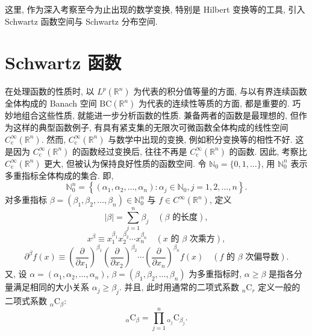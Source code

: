 
这里, 作为深入考察至今为止出现的数学变换, 特别是 Hilbert 变换等的工具, 引入 Schwartz 函数空间与 Schwartz 分布空间.

\section{Schwartz 函数}\label{sec:5.1}










在处理函数的性质时, 以 $L^{p}(\mathbb{R}^{n})$ 为代表的积分值等量的方面, 与以有界连续函数全体构成的 Banach 空间 $\mathrm{BC}(\mathbb{R}^{n})$ 为代表的连续性等质的方面, 都是重要的. 巧妙地组合这些性质, 就能进一步分析函数的性质. 兼备两者的函数是最理想的, 但作为这样的典型函数例子, 有具有紧支集的无限次可微函数全体构成的线性空间 $C_{\mathrm{c}}^{\infty}(\mathbb{R}^{n})$. 然而, $C_{\mathrm{c}}^{\infty}(\mathbb{R}^{n})$ 与数学中出现的变换, 例如积分变换等的相性不好. 这是因为 $C_{\mathrm{c}}^{\infty}(\mathbb{R}^{n})$ 的函数经过变换后, 往往不再是 $C_{\mathrm{c}}^{\infty}(\mathbb{R}^{n})$ 的函数. 因此, 考察比 $C_{\mathrm{c}}^{\infty}(\mathbb{R}^{n})$ 更大, 但被认为保持良好性质的函数空间. 令 $\mathbb{N}_{0} = \{0, 1, \ldots\}$, 用 $\mathbb{N}_{0}^{n}$ 表示多重指标全体构成的集合. 即,
\[
\mathbb{N}_{0}^{n} = \left\{(\alpha_{1}, \alpha_{2}, \ldots, \alpha_{n}) : \alpha_{j} \in \mathbb{N}_{0}, j = 1, 2, \ldots, n\right\}.
\]
对多重指标 $\beta = (\beta_{1}, \beta_{2}, \ldots, \beta_{n}) \in \mathbb{N}_{0}^{n}$ 与 $f \in C^{\infty}(\mathbb{R}^{n})$, 定义
\[
|\beta| = \sum_{j=1}^{n}\beta_{j} \quad (\beta \text{ 的长度}),
\]
\[
x^{\beta} \equiv x_{1}^{\beta_{1}}x_{2}^{\beta_{2}}\cdots x_{n}^{\beta_{n}} \quad (x \text{ 的 } \beta \text{ 次乘方}),
\]
\[
\partial^{\beta}f(x) \equiv \left(\frac{\partial}{\partial x_{1}}\right)^{\beta_{1}}\left(\frac{\partial}{\partial x_{2}}\right)^{\beta_{2}}\cdots\left(\frac{\partial}{\partial x_{n}}\right)^{\beta_{n}}f(x) \quad (f \text{ 的 } \beta \text{ 次偏导数}).
\]
又, 设 $\alpha = (\alpha_{1}, \alpha_{2}, \ldots, \alpha_{n})$, $\beta = (\beta_{1}, \beta_{2}, \ldots, \beta_{n})$ 为多重指标时, $\alpha \geq \beta$ 是指各分量满足相同的大小关系 $\alpha_{j} \geq \beta_{j}$. 并且, 此时用通常的二项式系数 ${}_{n}\mathrm{C}_{r}$ 定义一般的二项式系数 ${}_{\alpha}\mathrm{C}_{\beta}$:
\[
{}_{\alpha}\mathrm{C}_{\beta} = \prod_{j=1}^{n}{}_{\alpha_{j}}\mathrm{C}_{\beta_{j}}.
\]

